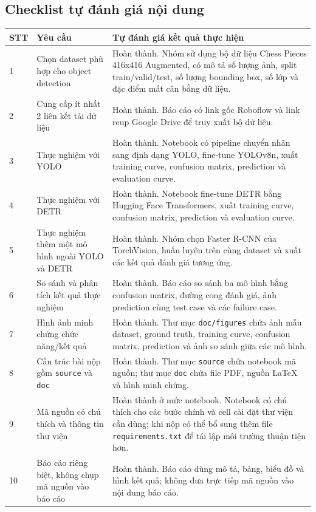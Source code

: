 \documentclass[12pt,a4paper]{article}
\begin{document}
\subsection*{Checklist tự đánh giá nội dung}

\begin{longtable}{p{}p{}p{}}
\toprule
\textbf{STT} & \textbf{Yêu cầu} & \textbf{Tự đánh giá kết quả thực hiện} \\
\midrule
1 & Chọn dataset phù hợp cho object detection & Hoàn thành. Nhóm sử dụng bộ dữ liệu Chess Pieces 416x416 Augmented, có mô tả số lượng ảnh, split train/valid/test, số lượng bounding box, số lớp và đặc điểm mất cân bằng dữ liệu. \\
2 & Cung cấp ít nhất 2 liên kết tải dữ liệu & Hoàn thành. Báo cáo có link gốc Roboflow và link reup Google Drive để truy xuất bộ dữ liệu. \\
3 & Thực nghiệm với YOLO & Hoàn thành. Notebook có pipeline chuyển nhãn sang định dạng YOLO, fine-tune YOLOv8n, xuất training curve, confusion matrix, prediction và evaluation curve. \\
4 & Thực nghiệm với DETR & Hoàn thành. Notebook fine-tune DETR bằng Hugging Face Transformers, xuất training curve, confusion matrix, prediction và evaluation curve. \\
5 & Thực nghiệm thêm một mô hình ngoài YOLO và DETR & Hoàn thành. Nhóm chọn Faster R-CNN của TorchVision, huấn luyện trên cùng dataset và xuất các kết quả đánh giá tương ứng. \\
6 & So sánh và phân tích kết quả thực nghiệm & Hoàn thành. Báo cáo so sánh ba mô hình bằng confusion matrix, đường cong đánh giá, ảnh prediction cùng test case và các failure case. \\
7 & Hình ảnh minh chứng chức năng/kết quả & Hoàn thành. Thư mục \texttt{doc/figures} chứa ảnh mẫu dataset, ground truth, training curve, confusion matrix, prediction và ảnh so sánh giữa các mô hình. \\
8 & Cấu trúc bài nộp gồm \texttt{source} và \texttt{doc} & Hoàn thành. Thư mục \texttt{source} chứa notebook mã nguồn; thư mục \texttt{doc} chứa file PDF, nguồn LaTeX và hình minh chứng. \\
9 & Mã nguồn có chú thích và thông tin thư viện & Hoàn thành ở mức notebook. Notebook có chú thích cho các bước chính và cell cài đặt thư viện cần dùng; khi nộp có thể bổ sung thêm file \texttt{requirements.txt} để tái lập môi trường thuận tiện hơn. \\
10 & Báo cáo riêng biệt, không chụp mã nguồn vào báo cáo & Hoàn thành. Báo cáo dùng mô tả, bảng, biểu đồ và hình kết quả; không đưa trực tiếp mã nguồn vào nội dung báo cáo. \\
\bottomrule
\end{longtable}
\end{document}
